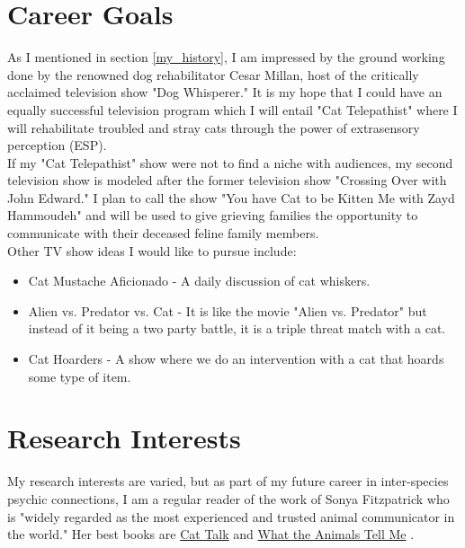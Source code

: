 \documentclass{article}
\begin{document}
\section{Career Goals}
As I mentioned in section \ref{my_history}, I am impressed by the ground working done by the renowned dog rehabilitator Cesar Millan, host of the critically acclaimed television show "Dog Whisperer." It is my hope that I could have an equally successful television program which I will entail "Cat Telepathist"  where I will rehabilitate troubled and stray cats through the power of extrasensory perception (ESP).\\

If my "Cat Telepathist" show were not to find a niche with audiences, my second television show is modeled after the former television show "Crossing Over with John Edward." \cite{calderwood} I plan to call the show "You have Cat to be Kitten Me with Zayd Hammoudeh" and will be used to give grieving families the opportunity to communicate with their deceased feline family members.\\

Other TV show ideas I would like to pursue include:
\begin{itemize}
	\item Cat Mustache Aficionado - A daily discussion of cat whiskers.
	\item Alien vs. Predator vs. Cat - It is like the movie "Alien vs. Predator" but instead of it being a two party battle, it is a triple threat match with a cat.
	\item Cat Hoarders - A show where we do an intervention with a cat that hoards some type of item.
\end{itemize}

\section{Research Interests}

My research interests are varied, but as part of my future career in inter-species psychic connections, I am a regular reader of the work of Sonya Fitzpatrick who is "widely regarded as the most experienced and trusted animal communicator in the world." \cite{fitzpatrick_2013}  Her best books are \underline{Cat Talk} \cite{fitzpatrick2003cat} and \underline{What the Animals Tell Me} \cite{fitzpatrick_smith_1997}.




\end{document}
